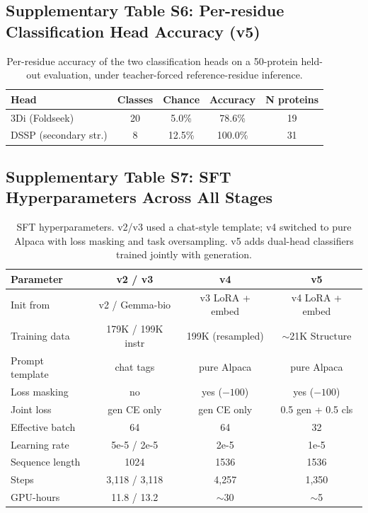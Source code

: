 \documentclass[11pt]{article}
\begin{document}
\subsection{Supplementary Table S6: Per-residue Classification Head Accuracy (v5)}

\begin{table}[H]
\centering
\caption{Per-residue accuracy of the two classification heads on a 50-protein held-out evaluation, under teacher-forced reference-residue inference.}
\begin{tabular}{lcccc}
\toprule
\textbf{Head} & \textbf{Classes} & \textbf{Chance} & \textbf{Accuracy} & \textbf{N proteins} \\
\midrule
3Di (Foldseek)        & 20 & 5.0\%  & 78.6\%  & 19 \\
DSSP (secondary str.) & 8  & 12.5\% & 100.0\% & 31 \\
\bottomrule
\end{tabular}
\end{table}

\subsection{Supplementary Table S7: SFT Hyperparameters Across All Stages}

\begin{table}[H]
\centering
\small
\caption{SFT hyperparameters. v2/v3 used a chat-style template; v4 switched to pure Alpaca with loss masking and task oversampling. v5 adds dual-head classifiers trained jointly with generation.}
\begin{tabular}{lccc}
\toprule
\textbf{Parameter} & \textbf{v2 / v3} & \textbf{v4} & \textbf{v5} \\
\midrule
Init from & v2 / Gemma-bio & v3 LoRA + embed & v4 LoRA + embed \\
Training data & 179K / 199K instr & 199K (resampled) & $\sim$21K Structure \\
Prompt template & chat tags & pure Alpaca & pure Alpaca \\
Loss masking & no & yes ($-100$) & yes ($-100$) \\
Joint loss & gen CE only & gen CE only & 0.5 gen + 0.5 cls \\
Effective batch & 64 & 64 & 32 \\
Learning rate & 5e-5 / 2e-5 & 2e-5 & 1e-5 \\
Sequence length & 1024 & 1536 & 1536 \\
Steps & 3,118 / 3,118 & 4,257 & 1,350 \\
GPU-hours & 11.8 / 13.2 & $\sim$30 & $\sim$5 \\
\bottomrule
\end{tabular}
\end{table}
\end{document}
